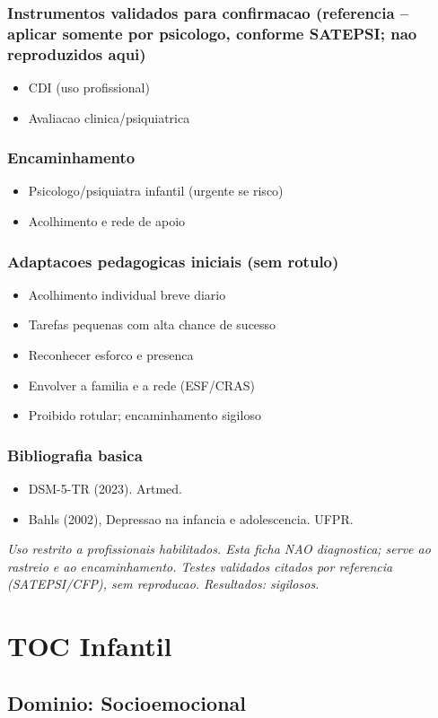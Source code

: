 \documentclass[a4paper,11pt]{book}
\newcommand{\avisolegal}{\par\medskip\noindent\footnotesize\itshape
\color{cinza}Uso restrito a profissionais habilitados. Esta ficha NAO diagnostica;
serve ao rastreio e ao encaminhamento. Testes validados citados por referencia
(SATEPSI/CFP), sem reproducao. Resultados: sigilosos.\color{black}\par}
\begin{document}
\subsection*{Instrumentos validados para confirmacao (referencia -- aplicar somente por psicologo, conforme SATEPSI; nao reproduzidos aqui)}
\begin{itemize}
\item CDI (uso profissional)
\item Avaliacao clinica/psiquiatrica
\end{itemize}
\subsection*{Encaminhamento}
\begin{itemize}
\item Psicologo/psiquiatra infantil (urgente se risco)
\item Acolhimento e rede de apoio
\end{itemize}
\subsection*{Adaptacoes pedagogicas iniciais (sem rotulo)}
\begin{itemize}
\item Acolhimento individual breve diario
\item Tarefas pequenas com alta chance de sucesso
\item Reconhecer esforco e presenca
\item Envolver a familia e a rede (ESF/CRAS)
\item Proibido rotular; encaminhamento sigiloso
\end{itemize}
\subsection*{Bibliografia basica}
\begin{itemize}
\item DSM-5-TR (2023). Artmed.
\item Bahls (2002), Depressao na infancia e adolescencia. UFPR.
\end{itemize}
\avisolegal


\chapter{TOC Infantil}
\section*{Dominio: Socioemocional}
\end{document}
